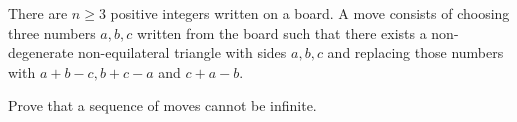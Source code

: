 There are $n \ge 3$ positive integers written on a board. A move consists of choosing three numbers $a, b, c$ written from the board such that there exists a non-degenerate non-equilateral triangle with sides $a, b, c$ and replacing those numbers with $a + b - c, b + c - a$ and $c + a - b$.

Prove that a sequence of moves cannot be infinite.